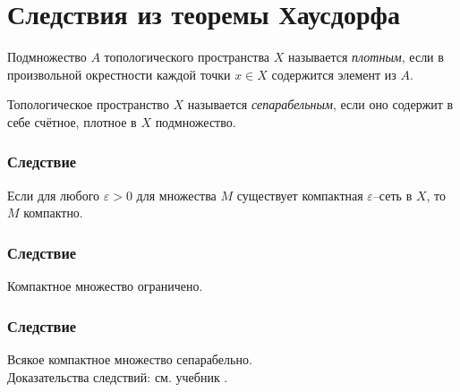 \section{Следствия из теоремы Хаусдорфа}
\label{sec:q-36}
Подмножество $A$ топологического пространства $X$ называется \textit{плотным}, если в произвольной окрестности каждой точки $x \in X$ содержится элемент из $A$.

Топологическое пространство $X$ называется \textit{сепарабельным}, если оно содержит в себе счётное, плотное в $X$ подмножество.

\subsubsection*{Следствие}
Если для любого $\varepsilon > 0$ для множества $M$ существует компактная $\varepsilon$--сеть в $X$, то $M$ компактно.

\subsubsection*{Следствие}
Компактное множество ограничено.

\subsubsection*{Следствие}
Всякое компактное множество сепарабельно.\\
Доказательства следствий: см. учебник \cite[с.~196]{trenogin}.